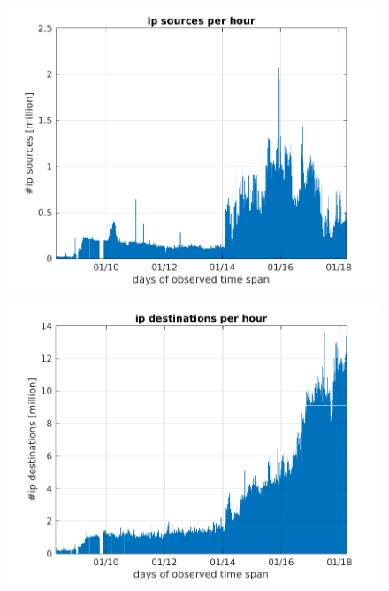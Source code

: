\documentclass{article}
\begin{document}
\begin{figure}[h]
    \centering
    \includegraphics[scale=.8]{../exercise-3/plots/rep_10_3}
\end{figure}

\begin{figure}[h]
    \centering
    \includegraphics[scale=.8]{../exercise-3/plots/rep_10_4}
\end{figure}
\end{document}
